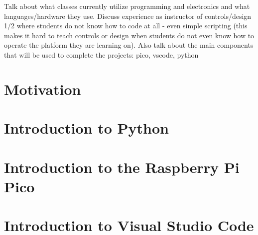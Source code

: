 Talk about what classes currently utilize programming and electronics 
and what languages/hardware they use. Discuss experience as instructor 
of controls/design 1/2 where students do not know how to code at 
all - even simple scripting (this makes it hard to teach controls or 
design when students do not even know how to operate the platform they
are learning on). Also talk about the main components that will be 
used to complete the projects: pico, vscode, python

\section{Motivation}


\section{Introduction to Python}

\section{Introduction to the Raspberry Pi Pico}

\section{Introduction to Visual Studio Code}